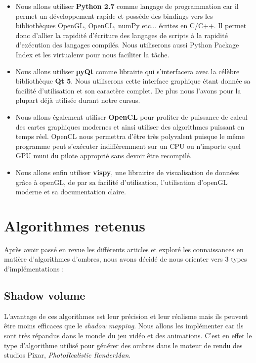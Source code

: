 \documentclass[a4paper,10pt]{report}
\begin{document}
\begin{itemize}
\item{Nous allons utiliser \textbf{Python 2.7} comme langage de programmation car il permet un développement rapide et possède des bindings vers les bibliothèques OpenGL, OpenCL, numPy etc... écrites en C/C++. Il permet donc d'allier la rapidité d'écriture des langages de scripts à la rapidité d'exécution des langages compilés. Nous utiliserons aussi Python Package Index et les virtualenv pour nous faciliter la t\^ache.}
\item{Nous allons utiliser \textbf{pyQt} comme librairie qui s'interfacera avec la célèbre bibliothèque \textbf{Qt 5}. Nous utiliserons cette interface graphique étant donnée sa facilité d'utilisation et son caractère complet. De plus nous l'avons pour la plupart déjà utilisée durant notre cursus.}
\item{Nous allons également utiliser \textbf{OpenCL} pour profiter de puissance de calcul des cartes graphiques modernes et ainsi utiliser des algorithmes puissant en temps réel. OpenCL nous permettra d'être très polyvalent puisque le même programme peut s'exécuter indifféremment sur un CPU ou n'importe quel GPU muni du pilote approprié sans devoir être recompilé.}
\item{Nous allons enfin utiliser \textbf{vispy}, une librairire de visualisation de données grâce à openGL, de par sa facilité d'utilisation, l'utilisation d'openGL moderne et sa documentation claire. }
\end{itemize}

\section{Algorithmes retenus}

Après avoir passé en revue les différents articles et exploré les connaissances en matière d'algorithmes d'ombres, nous avons décidé de nous orienter vers 3 types d'implémentations : 

\subsection{Shadow volume}

L'avantage de ces algorithmes est leur précision et leur réalisme mais ils peuvent être moins efficaces que le \textit{shadow mapping}. Nous allons les implémenter car ils sont très répandus dans le monde du jeu vidéo et des animations. C'est en effet le type d'algorithme utilisé pour générer des ombres dans le moteur de rendu des studios Pixar, \textit{PhotoRealistic RenderMan}. 
\end{document}
